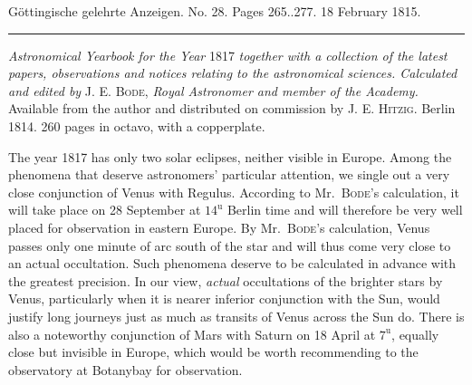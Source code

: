 \clearpage
{}
\hypertarget{native-581-lower}{}
\begin{center}\small Göttingische gelehrte Anzeigen. No. 28. Pages 265..277. 18 February 1815.\\[3pt]\rule{.72\linewidth}{.3pt}\end{center}

\emph{Astronomical Yearbook for the Year} 1817 \emph{together with a collection of the latest papers, observations and notices relating to the astronomical sciences. Calculated and edited by} J. E. \textsc{Bode}, \emph{Royal Astronomer and member of the Academy.} Available from the author and distributed on commission by J. E. \textsc{Hitzig}. Berlin 1814. 260 pages in octavo, with a copperplate.

The year 1817 has only two solar eclipses, neither visible in Europe. Among the phenomena that deserve astronomers’ particular attention, we single out a very close conjunction of Venus with Regulus. According to Mr.\ \textsc{Bode}’s calculation, it will take place on 28 September at $14^{\mathrm{u}}$ Berlin time and will therefore be very well placed for observation in eastern Europe. By Mr.\ \textsc{Bode}’s calculation, Venus passes only one minute of arc south of the star and will thus come very close to an actual occultation. Such phenomena deserve to be calculated in advance with the greatest precision. In our view, \emph{actual} occultations of the brighter stars by Venus, particularly when it is nearer inferior conjunction with the Sun, would justify long journeys just as much as transits of Venus across the Sun do. There is also a noteworthy conjunction of Mars with Saturn on 18 April at $7^{\mathrm{u}}$, equally close but invisible in Europe, which would be worth recommending to the observatory at Botanybay for observation.

